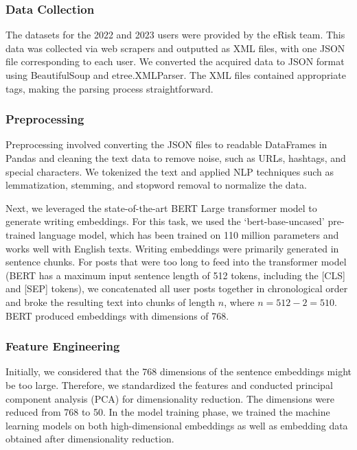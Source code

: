 \documentclass[]{style/ceurart}
\begin{document}
\subsubsection{Data Collection}

The datasets for the 2022 and 2023 users were provided by the eRisk team. This data was collected via web scrapers and outputted as XML files, with one JSON file corresponding to each user. We converted the acquired data to JSON format using BeautifulSoup and etree.XMLParser. The XML files contained appropriate tags, making the parsing process straightforward.

\subsubsection{Preprocessing}

Preprocessing involved converting the JSON files to readable DataFrames in Pandas and cleaning the text data to remove noise, such as URLs, hashtags, and special characters. We tokenized the text and applied NLP techniques such as lemmatization, stemming, and stopword removal to normalize the data.

Next, we leveraged the state-of-the-art BERT Large transformer model to generate writing embeddings. For this task, we used the `bert-base-uncased' pre-trained language model, which has been trained on 110 million parameters and works well with English texts. Writing embeddings were primarily generated in sentence chunks. For posts that were too long to feed into the transformer model (BERT has a maximum input sentence length of 512 tokens, including the [CLS] and [SEP] tokens), we concatenated all user posts together in chronological order and broke the resulting text into chunks of length \( n \), where \( n = 512 - 2 = 510 \). BERT produced embeddings with dimensions of 768.

\subsubsection{Feature Engineering}

Initially, we considered that the 768 dimensions of the sentence embeddings might be too large. Therefore, we standardized the features and conducted principal component analysis (PCA) for dimensionality reduction. The dimensions were reduced from 768 to 50. In the model training phase, we trained the machine learning models on both high-dimensional embeddings as well as embedding data obtained after dimensionality reduction.
\end{document}
